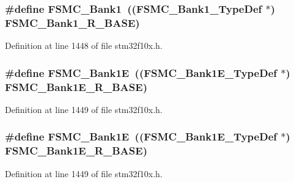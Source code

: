 \subsubsection[{\texorpdfstring{F\+S\+M\+C\+\_\+\+Bank1}{FSMC_Bank1}}]{\setlength{\rightskip}{0pt plus 5cm}\#define F\+S\+M\+C\+\_\+\+Bank1~(({\bf F\+S\+M\+C\+\_\+\+Bank1\+\_\+\+Type\+Def} $\ast$) {\bf F\+S\+M\+C\+\_\+\+Bank1\+\_\+\+R\+\_\+\+B\+A\+SE})}\hypertarget{group___peripheral__declaration_ga2a759bad07fe730c99f9e1490e646220}{}\label{group___peripheral__declaration_ga2a759bad07fe730c99f9e1490e646220}


Definition at line 1448 of file stm32f10x.\+h.

\subsubsection[{\texorpdfstring{F\+S\+M\+C\+\_\+\+Bank1E}{FSMC_Bank1E}}]{\setlength{\rightskip}{0pt plus 5cm}\#define F\+S\+M\+C\+\_\+\+Bank1E~(({\bf F\+S\+M\+C\+\_\+\+Bank1\+E\+\_\+\+Type\+Def} $\ast$) {\bf F\+S\+M\+C\+\_\+\+Bank1\+E\+\_\+\+R\+\_\+\+B\+A\+SE})}\hypertarget{group___peripheral__declaration_ga422986101f42a8811ae89ac69deb2759}{}\label{group___peripheral__declaration_ga422986101f42a8811ae89ac69deb2759}


Definition at line 1449 of file stm32f10x.\+h.

\subsubsection[{\texorpdfstring{F\+S\+M\+C\+\_\+\+Bank1E}{FSMC_Bank1E}}]{\setlength{\rightskip}{0pt plus 5cm}\#define F\+S\+M\+C\+\_\+\+Bank1E~(({\bf F\+S\+M\+C\+\_\+\+Bank1\+E\+\_\+\+Type\+Def} $\ast$) {\bf F\+S\+M\+C\+\_\+\+Bank1\+E\+\_\+\+R\+\_\+\+B\+A\+SE})}\hypertarget{group___peripheral__declaration_ga422986101f42a8811ae89ac69deb2759}{}\label{group___peripheral__declaration_ga422986101f42a8811ae89ac69deb2759}


Definition at line 1449 of file stm32f10x.\+h.

